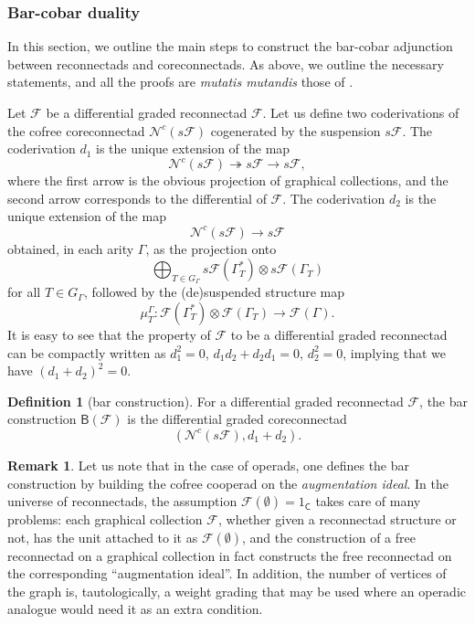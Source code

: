 \documentclass[11pt]{article}
\theoremstyle{definition}
\newtheorem{defi}[theo]{Definition}
\newtheorem{rema}[theo]{Remark}
\numberwithin{equation}{section}
\newcommand\calF{\mathcal{F}}
\newcommand\calN{\mathcal{N}}
\DeclareMathOperator{\sfC}{\mathsf{C}}
\begin{document}
\subsubsection{Bar-cobar duality}

In this section, we outline the main steps to construct the bar-cobar adjunction between reconnectads and coreconnectads. As above, we outline the necessary statements, and all the proofs are \emph{mutatis mutandis} those of \cite[Sec.~6.5]{MR2954392}. 

Let $\calF$ be a differential graded reconnectad $\calF$. Let us define two coderivations of the cofree coreconnectad $\calN^c(s\calF)$ cogenerated by the suspension $s\calF$. The coderivation $d_1$ is the unique extension of the map
 \[
\calN^c(s\calF)\twoheadrightarrow s\calF\to s\calF,
 \]
where the first arrow is the obvious projection of graphical collections, and the second arrow corresponds to the differential of $\calF$. The coderivation $d_2$ is the unique extension of the map
 \[
\calN^c(s\calF)\to s\calF 
 \]
obtained, in each arity $\Gamma$, as the projection onto
 \[
\bigoplus_{T\in G_\Gamma}s\calF(\Gamma^*_T)\otimes s\calF(\Gamma_T)
 \]
for all $T\in G_\Gamma$, followed by the (de)suspended structure map 
 \[
\mu_T^\Gamma\colon \calF(\Gamma^*_T)\otimes \calF(\Gamma_T)\to \calF(\Gamma).
 \] 
It is easy to see that the property of $\calF$ to be a differential graded reconnectad can be compactly written as $d_1^2=0$, $d_1d_2+d_2d_1=0$, $d_2^2=0$, implying that we have $(d_1+d_2)^2=0$.

\begin{defi}[bar construction]
For a differential graded reconnectad $\calF$, the bar construction $\mathsf{B}(\calF)$ is the differential graded coreconnectad 
 \[
(\calN^c(s\calF),d_1+d_2).
 \]
\end{defi}

\begin{rema}
Let us note that in the case of operads, one defines the bar construction by building the cofree cooperad on the \emph{augmentation ideal}. 
In the universe of reconnectads, the assumption $\calF(\emptyset)=1_{\sfC}$ takes care of many problems: each graphical collection $\calF$, whether given a reconnectad structure or not, has the unit attached to it as $\calF(\emptyset)$, and the construction of a free reconnectad on a graphical collection in fact constructs the free reconnectad on the corresponding ``augmentation ideal''. In addition, the number of vertices of the graph is, tautologically, a weight grading that may be used where an operadic analogue would need it as an extra condition.  
\end{rema}
\end{document}
